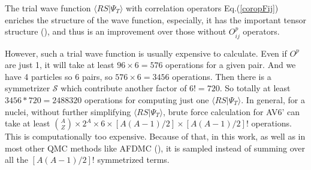\documentclass[12pt,letterpaper,UTF8]{report}
\begin{document}
The trial wave function $\langle R S | \Psi_T  \rangle$ with correlation operators Eq.(\ref{coropFij}) enriches the structure of the wave function, especially, it has the important tensor structure (\cite{CarlsonRMP15a}), and thus is an improvement over those without $O_{ij}^p$ operators.

However, such a trial wave function is usually expensive to calculate.
Even if $O^p$ are just 1, it will take at least $96 \times 6= 576$ operations for a given pair. And we have 4 particles so 6 pairs, so $576\times 6=3456$ operations. Then there is a symmetrizer $\mathcal{S}$ which contribute another factor of $6!=720$. So totally at least $3456*720=2488320$ operations for computing just one $\langle R S | \Psi_T  \rangle$. In general, for a nuclei, without further simplifying $\langle R S | \Psi_T  \rangle$, brute force calculation for AV6' can take at least $ \binom{A}{Z} \times 2^{A} \times 6 \times [A(A-1)/2] \times [A(A-1)/2]!$ operations. This is computationally too expensive.
Because of that, in this work, as well as in most other QMC methods like AFDMC (\cite{Schmidt99a}),  it is sampled instead of summing over all the $[A(A-1)/2]!$ symmetrized terms.
\end{document}

